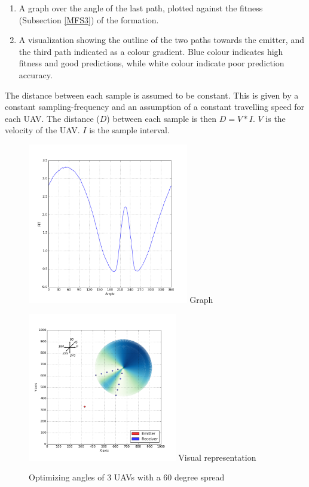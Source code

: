 \documentclass[10pt,a4paper]{book}
\begin{document}
\begin{enumerate}
\item A graph over the angle of the last path, plotted against the fitness (Subsection \ref{MFS3}) of the formation.
\item A visualization showing the outline of the two paths towards the emitter, and the third path indicated as a colour gradient. Blue colour indicates high fitness and good predictions, while white colour indicate poor prediction accuracy. 
\end{enumerate} 


The distance between each sample is assumed to be constant. This is given by a constant sampling-frequency and an assumption of a constant travelling speed for each \gls{UAV}. The distance ($D$) between each sample is then $D = V * I$. $V$ is the velocity of the \gls{UAV}. $I$ is the sample interval. 


\begin{figure}[H]
\centering
\begin{minipage}{65mm}
  \centering
  \includegraphics[width=70mm]{optangles/3uavs5steps60deg_1.png}
  Graph
\end{minipage}%
\begin{minipage}{65mm}
  \centering
  \includegraphics[width=65mm]{optangles/3uavs5steps60deg_2.png}
  Visual representation
\end{minipage}
\caption{Optimizing angles of 3 \glspl{UAV} with a 60 degree spread}
\label{optangles_60deg_3uavs}
\end{figure}
\end{document}

